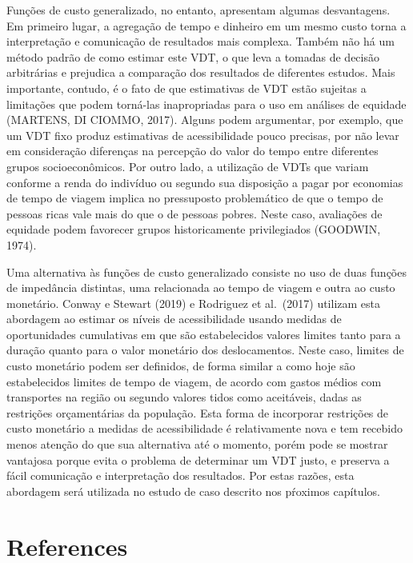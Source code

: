 \documentclass[msc,numbers]{coppe}
\begin{document}
  Funções de custo generalizado, no entanto, apresentam algumas desvantagens. Em primeiro lugar, a agregação de tempo e dinheiro em um mesmo custo torna a interpretação e comunicação de resultados mais complexa. Também não há um método padrão de como estimar este VDT, o que leva a tomadas de decisão arbitrárias e prejudica a comparação dos resultados de diferentes estudos. Mais importante, contudo, é o fato de que estimativas de VDT estão sujeitas a limitações que podem torná-las inapropriadas para o uso em análises de equidade (MARTENS, DI CIOMMO, 2017). Alguns podem argumentar, por exemplo, que um VDT fixo produz estimativas de acessibilidade pouco precisas, por não levar em consideração diferenças na percepção do valor do tempo entre diferentes grupos socioeconômicos. Por outro lado, a utilização de VDTs que variam conforme a renda do indivíduo ou segundo sua disposição a pagar por economias de tempo de viagem implica no pressuposto problemático de que o tempo de pessoas ricas vale mais do que o de pessoas pobres. Neste caso, avaliações de equidade podem favorecer grupos historicamente privilegiados (GOODWIN, 1974).

  Uma alternativa às funções de custo generalizado consiste no uso de duas funções de impedância distintas, uma relacionada ao tempo de viagem e outra ao custo monetário. Conway e Stewart (2019) e Rodriguez et al.~(2017) utilizam esta abordagem ao estimar os níveis de acessibilidade usando medidas de oportunidades cumulativas em que são estabelecidos valores limites tanto para a duração quanto para o valor monetário dos deslocamentos. Neste caso, limites de custo monetário podem ser definidos, de forma similar a como hoje são estabelecidos limites de tempo de viagem, de acordo com gastos médios com transportes na região ou segundo valores tidos como aceitáveis, dadas as restrições orçamentárias da população. Esta forma de incorporar restrições de custo monetário a medidas de acessibilidade é relativamente nova e tem recebido menos atenção do que sua alternativa até o momento, porém pode se mostrar vantajosa porque evita o problema de determinar um VDT justo, e preserva a fácil comunicação e interpretação dos resultados. Por estas razões, esta abordagem será utilizada no estudo de caso descrito nos pŕoximos capítulos.

  \hypertarget{references}{%
  \chapter*{References}\label{references}}

  
  
\end{document}
